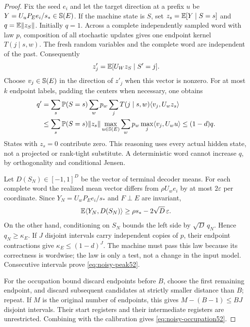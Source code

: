 \begin{proof}
Fix the seed $e_i$ and let the target direction at a prefix $u$ be
$Y=U_uP_Ee_i/s_*\in\mathbb S(E)$. If the machine state is $S$, set
$z_s=\mathbb E[Y\mid S=s]$ and $q=\mathbb E\|z_S\|$. Initially $q=1$.
Across a complete independently sampled word with law $p$, composition
of all stochastic updates gives one endpoint kernel $T(j\mid s,w)$.
The fresh random variables and the complete word are independent of
the past. Consequently
\[
 z'_j=\mathbb E[U_Wz_S\mid S'=j].
\]
Choose $v_j\in\mathbb S(E)$ in the direction of $z'_j$ when this vector
is nonzero. For at most $k$ endpoint labels, padding the centers when
necessary, one obtains
\begin{align*}
 q'&=\sum_s\mathbb P(S=s)\sum_w p_w\sum_jT(j\mid s,w)
                                      \langle v_j,U_wz_s\rangle\\
   &\le\sum_s\mathbb P(S=s)\|z_s\|
          \max_{u\in\mathbb S(E)}\sum_wp_w\max_j\langle v_j,U_wu\rangle
    \le(1-d)q.
\end{align*}
States with $z_s=0$ contribute zero. This reasoning uses every actual
hidden state, not a projected or rank-tight substitute. A deterministic
word cannot increase $q$, by orthogonality and conditional Jensen.

Let $D(S_N)\in[-1,1]^D$ be the vector of terminal decoder means.
For each complete word the realized mean vector differs from
$\rho U_we_i$ by at most $2\varepsilon$ per coordinate. Since
$Y_N=U_wP_Ee_i/s_*$ and $F\perp E$ are invariant,
\[
 \mathbb E\langle Y_N,D(S_N)\rangle\ge\rho s_*-2\sqrt D\,\varepsilon.
\]
On the other hand, conditioning on $S_N$ bounds the left side by
$\sqrt D\,q_N$. Hence $q_N\ge\kappa_E$. If $J$ disjoint intervals
carry independent copies of $p$, their endpoint contractions give
$\kappa_E\le(1-d)^J$. The machine must pass this law because its
correctness is wordwise; the law is only a test, not a change in the
input model. Consecutive intervals prove \eqref{eq:noisy-peak52}.

For the occupation bound discard endpoints before $B$, choose the
first remaining endpoint, and discard subsequent candidates at
strictly smaller distance than $B$; repeat. If $M$ is the original
number of endpoints, this gives $M-(B-1)\le BJ$ disjoint intervals.
Their start registers and their intermediate registers are unrestricted.
Combining with the calibration gives \eqref{eq:noisy-occupation52}.
\end{proof}

